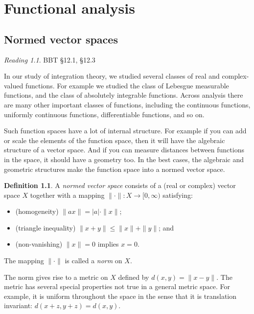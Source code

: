 \documentclass[11pt,oneside]{amsbook}
\theoremstyle{definition}
\theoremstyle{plain}
\theoremstyle{definition}
\newtheorem{defn}[thm]{Definition}
\theoremstyle{remark}
\newtheorem*{reading}{Reading}
\numberwithin{equation}{section}
\numberwithin{figure}{section}
\begin{document}
\chapter{Functional analysis}

\section{Normed vector spaces}

\begin{reading}
  BBT \S 12.1, \S 12.3
\end{reading}

In our study of integration theory, we studied several classes of real and complex-valued functions. For example we studied the class of Lebesgue measurable functions, and the class of absolutely integrable functions. Across analysis there are many other important classes of functions, including the continuous functions, uniformly continuous functions, differentiable functions, and so on.

Such function spaces have a lot of internal structure. For example if you can add or scale the elements of the function space, then it will have the algebraic structure of a vector space. And if you can measure distances between functions in the space, it should have a geometry too. In the best cases, the algebraic and geometric structures make the function space into a normed vector space.

\begin{defn}
  A \emph{normed vector space} consists of a (real or complex) vector space $X$ together with a mapping $\|\cdot\|\colon X\to[0,\infty)$ satisfying:
  \begin{itemize}
  \item (homogeneity) $\|ax\|=|a|\cdot\|x\|$;
  \item (triangle inequality) $\|x+y\|\leq\|x\|+\|y\|$; and
  \item (non-vanishing) $\|x\|=0$ implies $x=0$.
  \end{itemize}
  The mapping $\|\cdot\|$ is called a \emph{norm} on $X$.
\end{defn}

The norm gives rise to a metric on $X$ defined by $d(x,y)=\|x-y\|$. The metric has several special properties not true in a general metric space. For example, it is uniform throughout the space in the sense that it is translation invariant: $d(x+z,y+z)=d(x,y)$.
\end{document}
